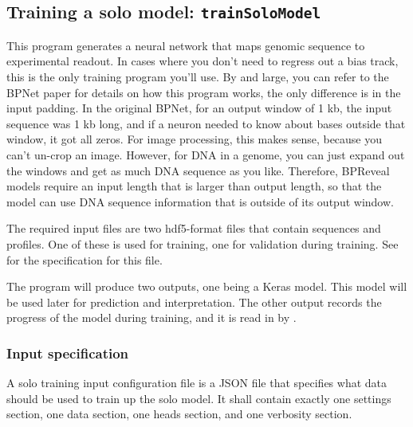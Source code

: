 \documentclass{article}
\begin{document}
\newpage


\subsection{Training a solo model: \texttt{trainSoloModel}}\label{prog:trainSoloModel}

This program generates a neural network that maps genomic sequence to experimental readout.
In cases where you don't need to regress out a bias track, this is the only training program
you'll use.
By and large, you can refer to the BPNet paper for details on how this program works, the only
difference is in the input padding.
In the original BPNet, for an output window of 1 kb, the input sequence was 1 kb long, and if
a neuron needed to know about bases outside that window, it got all zeros.
For image processing, this makes sense, because you can't un-crop an image. However, for DNA in
a genome, you can just expand out the windows and get as much DNA sequence as you like.
Therefore, BPReveal models require an input length that is larger than output length, so that
the model can use DNA sequence information that is outside of its output window.

The required input files are two hdf5-format files that contain sequences and profiles.
One of these is used for training, one for validation during training.
See  for the specification for this file.

The program will produce two outputs, one being a Keras model. This model will be used later
for prediction and interpretation.
The other output records the progress of the model during training, and it is read in
by .


\subsubsection{Input specification}

A solo training input configuration file is a JSON file that specifies what data should
be used to train up the solo model.
It shall contain exactly one settings section, one data section, one heads section,
and one verbosity section.
\end{document}
